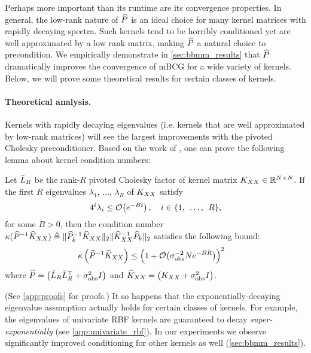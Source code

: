 Perhaps more important than its runtime are its convergence properties.
In general, the low-rank nature of $\widehat{P}$ is an ideal choice for many kernel matrices with rapidly decaying spectra.
Such kernels tend to be horribly conditioned yet are well approximated by a low rank matrix, making $\widehat{P}$ a natural choice to precondition.
We empirically demonstrate in \cref{sec:bbmm_results} that $\widehat{P}$ dramatically improves the convergence of mBCG for a wide variety of kernels.
Below, we will prove some theoretical results for certain classes of kernels.


\paragraph{Theoretical analysis.}
Kernels with rapidly decaying eigenvalues (i.e. kernels that are well approximated by low-rank matrices) will see the largest improvements with the pivoted Cholesky preconditioner.
Based on the work of \citet{harbrecht2012low}, one can prove the following lemma about kernel condition numbers:
%
\begin{lemma}
  \label{thm:condition_number}
  Let $\bar{L}_{R}$ be the rank-$R$ pivoted Cholesky factor of kernel matrix $K_{XX} \in \mathbb{R}^{N \times N}$.
  If the first $R$ eigenvalues $\lambda_1$, $\ldots$, $\lambda_R$ of $K_{XX}$ satisfy
	\begin{equation}
		4^{i}\lambda_{i} \leq \bigo{e^{-Bi}}, \quad i \in \{ 1, \:\: \ldots, \:\: R \},
		\label{eqn:pcp_condition}
	\end{equation}
	for some $B>0$, then the condition number $\kappa(\widehat{P}^{-1}\widehat{K}_{XX}) \triangleq \Vert \widehat{P}_{k}^{-1}\widehat{K}_{XX} \Vert_{2} \Vert \widehat{K}_{XX}^{-1}\widehat{P}_{k} \Vert_{2}$
	satisfies the following bound:
  \begin{align}
    \kappa \left( \trainP^{-1}\trainK \right)
    &\leq \Bigl( 1 + \bigo{\sigma^{-2}_\text{obs} N e^{-BR}} \Bigr)^2
		\nonumber
  \end{align}
	where $\widehat{P} = \left( \bar{L}_R \bar{L}_R^\top + \sigma^2_\text{obs} I \right)$ and $\widehat{K}_{XX} = \left( K_{XX} + \sigma^2_\text{obs} I \right)$.
\end{lemma}
%
\noindent
(See \cref{app:proofs} for proofs.)
It so happens that the exponentially-decaying eigenvalue assumption actually holds for certain classes of kernels.
For example, the eigenvalues of univariate RBF kernels are guaranteed to decay \emph{super-exponentially} (see \cref{app:univariate_rbf}).
In our experiments we observe significantly improved conditioning for other kernels as well (\cref{sec:bbmm_results}).

